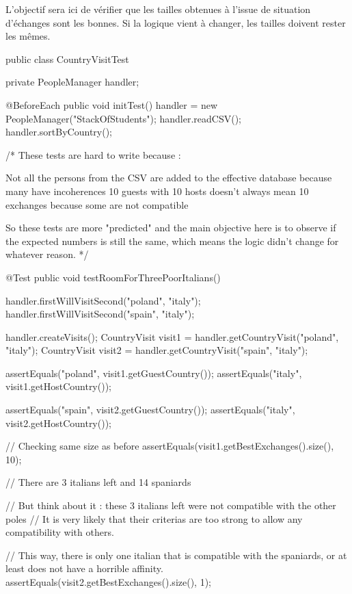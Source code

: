 \documentclass{mytex}
\begin{document}

L'objectif sera ici de vérifier que les tailles obtenues à l'issue de situation d'échanges sont les bonnes. Si la logique vient à changer, les tailles doivent rester les mêmes.

\begin{codebox}
public class CountryVisitTest {
	
	private PeopleManager handler;
	
	@BeforeEach
	public void initTest() {
		handler = new PeopleManager("StackOfStudents");
		handler.readCSV();
		handler.sortByCountry();
	}
	
	/* These tests are hard to write because :
	
	Not all the persons from the CSV are added to the effective database because many have incoherences
	10 guests with 10 hosts doesn't always mean 10 exchanges because some are not compatible
	
	So these tests are more "predicted" and the main objective here is to observe if the expected numbers is still the same, which means the logic didn't change for whatever reason.
	*/ 
	
    @Test 
	public void testRoomForThreePoorItalians() {
		handler.firstWillVisitSecond("poland", "italy");
		handler.firstWillVisitSecond("spain", "italy");
		
		handler.createVisits();
		CountryVisit visit1 = handler.getCountryVisit("poland", "italy");
		CountryVisit visit2 = handler.getCountryVisit("spain", "italy");
		
		assertEquals("poland", visit1.getGuestCountry());
		assertEquals("italy", visit1.getHostCountry());
		
		assertEquals("spain", visit2.getGuestCountry());
		assertEquals("italy", visit2.getHostCountry());
		
		// Checking same size as before
		assertEquals(visit1.getBestExchanges().size(), 10);
		
		// There are 3 italians left and 14 spaniards
		
		// But think about it : these 3 italians left were not compatible with the other poles
		// It is very likely that their criterias are too strong to allow any compatibility with others.
		
		// This way, there is only one italian that is compatible with the spaniards, or at least does not have a horrible affinity.
		assertEquals(visit2.getBestExchanges().size(), 1);
	}
}
\end{codebox}
\end{document}
